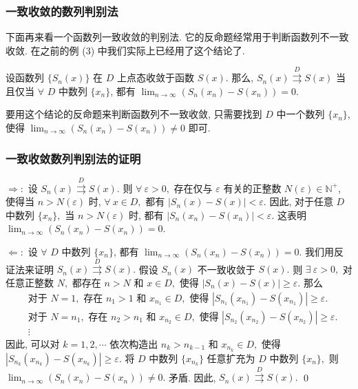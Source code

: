 
\begin{frame}
\frametitle{一致收敛的数列判别法}

下面再来看一个函数列一致收敛的判别法. 它的反命题经常用于判断函数列不一致收敛. 在之前的例 (3) 中我们实际上已经用了这个结论了.

\pause
\vspace{0.5em}

\begin{thm}[函数列一致收敛的数列判别法]
设函数列 $\{S_n(x)\}$ 在 $D$ 上点态收敛于函数 $S(x).$ 那么, $S_n(x) \stackrel{D}{\rightrightarrows} S(x)$ 当且仅当 $\forall$ $D$ 中数列 $\{x_n\}$, 都有 $\lim_{n \to \infty} (S_n(x_n) - S(x_n)) = 0.$
\end{thm}

\pause
\vspace{0.5em}

要用这个结论的反命题来判断函数列不一致收敛, 只需要找到 $D$ 中一个数列 $\{x_n\}$, 使得 $\lim_{n \to \infty} (S_n(x_n) - S(x_n)) \neq 0$ 即可.

\end{frame}


\begin{frame}
\frametitle{一致收敛数列判别法的证明}

$\Longrightarrow:$ 设 $S_n(x) \stackrel{D}{\rightrightarrows} S(x).$ 则 $\forall ~ \varepsilon > 0,$ 存在仅与 $\varepsilon$ 有关的正整数 $N(\varepsilon) \in \mathbb{N}^+$, 使得当 $n > N(\varepsilon)$ 时, $\forall ~ x \in D,$ 都有 $|S_n(x) - S(x)| < \varepsilon.$ 因此, 对于任意 $D$ 中数列 $\{x_n\},$ 当 $n > N(\varepsilon)$ 时, 都有 $|S_n(x_n) - S(x_n)| < \varepsilon.$ 这表明 $\lim_{n \to \infty} (S_n(x_n) - S(x_n)) = 0.$

\pause
\vspace{1em}

$\Longleftarrow:$ 设 $\forall$ $D$ 中数列 $\{x_n\}$, 都有 $\lim_{n \to \infty} (S_n(x_n) - S(x_n)) = 0.$ 我们用反证法来证明 $S_n(x) \stackrel{D}{\rightrightarrows} S(x).$ 假设 $S_n(x)$ 不一致收敛于 $S(x).$ 则 $\exists ~ \varepsilon > 0,$ 对任意正整数 $N,$ 都存在 $n > N$ 和 $x \in D,$ 使得 $|S_n(x) - S(x)| \geqslant \varepsilon.$ 那么
\begin{align*}
& \text{对于 $N=1,$ 存在 $n_1 > 1$ 和 $x_{n_1} \in D,$ 使得 $|S_{n_1}(x_{n_1}) - S(x_{n_1})| \geqslant \varepsilon.$} \\
& \text{对于 $N=n_1,$ 存在 $n_2 > n_1$ 和 $x_{n_2} \in D,$ 使得 $|S_{n_2}(x_{n_2}) - S(x_{n_2})| \geqslant \varepsilon.$} \\
& \vdots
\end{align*}
因此, 可以对 $k = 1, 2, \cdots$ 依次构造出 $n_k > n_{k-1}$ 和 $x_{n_k} \in D,$ 使得 $|S_{n_k}(x_{n_k}) - S(x_{n_k})| \geqslant \varepsilon.$ 将 $D$ 中数列 $\{x_{n_k}\}$ 任意扩充为 $D$ 中数列 $\{x_n\},$ 则 $\lim_{n \to \infty} (S_n(x_n) - S(x_n)) \neq 0.$ 矛盾. 因此, $S_n(x) \stackrel{D}{\rightrightarrows} S(x).$
\qed

\end{frame}

